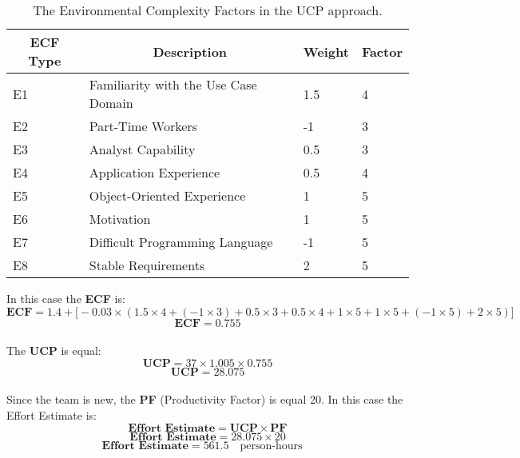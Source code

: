 \documentclass[12pt]{article}
\begin{document}
\begin{table}[h]
\centering
\begin{tabular}{|l|l|l|l|}
\hline
\multicolumn{1}{|c|}{\textbf{ECF Type}} & \multicolumn{1}{c|}{\textbf{Description}} & \multicolumn{1}{c|}{\textbf{Weight}} & \multicolumn{1}{c|}{\textbf{Factor}} \\ \hline
E1 & Familiarity with the Use Case Domain & 1.5 & 4 \\ \hline
E2 & Part-Time Workers & -1 & 3 \\ \hline
E3 & Analyst Capability & 0.5 & 3 \\ \hline
E4 & Application Experience & 0.5 & 4 \\ \hline
E5 & Object-Oriented Experience & 1 & 5 \\ \hline
E6 & Motivation & 1 & 5 \\ \hline
E7 & Difficult Programming Language & -1 & 5 \\ \hline
E8 & Stable Requirements & 2 & 5 \\ \hline
\end{tabular}
\caption{The Environmental Complexity Factors in the UCP approach.}
\end{table}

In this case the \textbf{ECF} is:
\begin{equation}
    \textbf{ECF} =  1.4 + \Big[-0.03 \times(1.5\times4+(-1\times3)+0.5\times3+0.5\times4+1\times5+1\times5+(-1\times5)+2\times5)\Big]
\end{equation}
\begin{equation}
    \textbf{ECF} =  0.755
\end{equation}\\

The \textbf{UCP} is equal:
\begin{equation}
    \textbf{UCP} = 37 \times 1.005 \times 0.755
\end{equation}
\begin{equation}
    \textbf{UCP} = 28.075
\end{equation}\\

Since the team is new, the \textbf{PF} (Productivity Factor) is equal 20.
In this case the Effort Estimate is:
\begin{equation}
    \textbf{Effort Estimate} = \textbf{UCP} \times \textbf{PF}
\end{equation}
\begin{equation}
    \textbf{Effort Estimate} = 28.075 \times 20
\end{equation}
\begin{equation}
    \textbf{Effort Estimate} = 561.5 \quad \textrm{person-hours} \quad
\end{equation}\\
\end{document}
